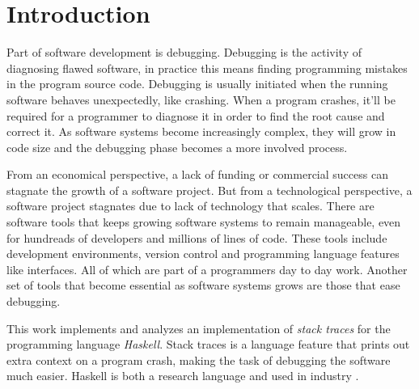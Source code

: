\chapter{Introduction}

Part of software development is debugging. Debugging is the activity of
diagnosing flawed software, in practice this means finding programming mistakes
in the program source code. Debugging is usually initiated when the running
software behaves unexpectedly, like crashing. When a program crashes, it'll be
required for a programmer to diagnose it in order to find the root cause and
correct it. As software systems become increasingly complex, they will grow in
code size and the debugging phase becomes a more involved process.

From an economical perspective, a lack of funding or commercial success can
stagnate the growth of a software project. But from a technological perspective, a
software project stagnates due to lack of technology that scales. There are
software tools that keeps growing software systems to remain manageable, even for
hundreads of developers and millions of lines of code. These tools include
development environments, version control and programming language features
like interfaces. All of which are part of a programmers day to day work.
Another set of tools that become essential as software systems grows are those
that ease debugging.

This work implements and analyzes an implementation of \emph{stack traces} for
the programming language \emph{Haskell}. Stack traces is a language feature
that prints out extra context on a program crash, making the task of debugging
the software much easier. Haskell is both a research language
\cite{haskell_org_research_papers}
\cite{dagit_getting_started_with_ghc_hacking} and used in industry
\cite{haskell_in_industry} \cite{fpcomplete_case_studies}.

